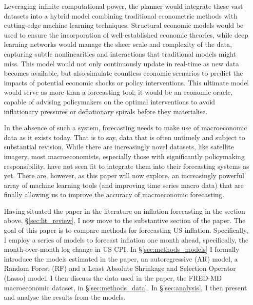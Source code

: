 Leveraging infinite computational power, the planner would integrate these vast datasets into a hybrid model combining traditional econometric methods with cutting-edge machine learning techniques. Structural economic models would be used to ensure the incorporation of well-established economic theories, while deep learning networks would manage the sheer scale and complexity of the data, capturing subtle nonlinearities and interactions that traditional models might miss. This model would not only continuously update in real-time as new data becomes available, but also simulate countless economic scenarios to predict the impacts of potential economic shocks or policy interventions. This ultimate model would serve as more than a forecasting tool; it would be an economic oracle, capable of advising policymakers on the optimal interventions to avoid inflationary pressures or deflationary spirals before they materialise. 

In the absence of such a system, forecasting needs to make use of macroeconomic data as it exists today. That is to say, data that is often untimely and subject to substantial revision. While there are increasingly novel datasets, like satellite imagery, most macroeconomists, especially those with significantly policymaking responsibility, have not seen fit to integrate them into their forecasting systems as yet. There are, however, as this paper will now explore, an increasingly powerful array of machine learning tools (and improving time series macro data) that are finally allowing us to improve the accuracy of macroeconomic forecasting.

Having situated the paper in the literature on inflation forecasting in the section above, \S \ref{sec:lit_review}, I now move to the substantive section of the paper. The goal of this paper is to compare methods for forecasting US inflation. Specifically, I employ a series of models to forecast inflation one month ahead, specifically, the month-over-month log change in US CPI. In \S \ref{sec:methods_models} I formally introduce the models estimated in the paper, an autoregressive (AR) model, a Random Forest (RF) and a Least Absolute Shrinkage and Selection Operator (Lasso) model. I then discuss the data used in the paper, the FRED-MD macroeconomic dataset, in \S \ref{sec:methods_data}. In \S \ref{sec:analysis}, I then present and analyse the results from the models. 
